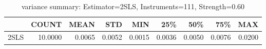 \begin{table}[ht]
\centering
\caption{variance summary: Estimator=2SLS, Instruments=111, Strength=0.60}
\begin{tabular}{lrrrrrrrr}
\toprule
 & COUNT & MEAN & STD & MIN & 25\% & 50\% & 75\% & MAX \\
\midrule
2SLS & 10.0000 & 0.0065 & 0.0052 & 0.0015 & 0.0036 & 0.0050 & 0.0076 & 0.0200 \\
\bottomrule
\end{tabular}
\end{table}
